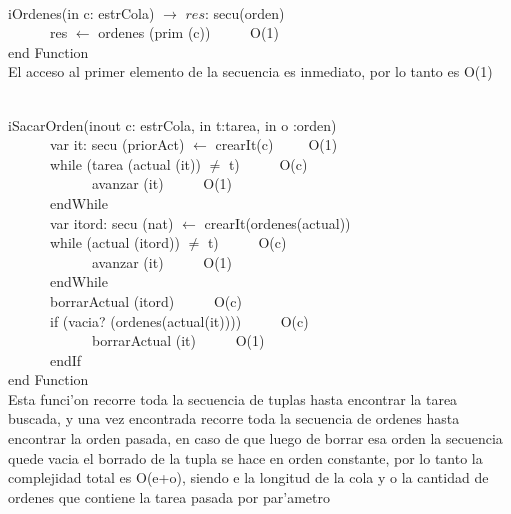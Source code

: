 \documentclass[a4paper,10pt]{article}
\begin{document}
\begin{algoritmo}
\caption{}\\
  iOrdenes(in c: estrCola) $\rightarrow$ $res$: secu(orden) \\
	\indent \ \ \ \ \ \  res $\gets$ ordenes (prim (c))  \ \ \ \ \ O(1)\\
    end Function \\
   
   El acceso al primer elemento de la secuencia es inmediato, por lo tanto es O(1)
\end{algoritmo}

\begin{algoritmo}
\caption{}\\
  iSacarOrden(inout c: estrCola, in t:tarea, in o :orden)\\
	\indent \ \ \ \ \ \ var it: secu (priorAct) $\gets$ crearIt(c)\ \ \ \ \ O(1)\\
	\indent \ \ \ \ \ \ while (tarea (actual (it)) $\neq$ t) \ \ \ \ \ O(c)\\
	\indent \ \ \ \ \ \ \ \ \ \ \ \  avanzar (it) \ \ \ \ \ O(1)\\
	\indent \ \ \ \ \ \ endWhile \ \ \ \ \ \\
	\indent \ \ \ \ \ \ var itord: secu (nat) $\gets$ crearIt(ordenes(actual)) \ \ \ \ \ \\
	\indent \ \ \ \ \ \ while (actual (itord)) $\neq$ t) \ \ \ \ \ O(c)\\
	\indent \ \ \ \ \ \ \ \ \ \ \ \  avanzar (it) \ \ \ \ \ O(1)\\
	\indent \ \ \ \ \ \ endWhile \ \ \ \ \ \\
	\indent \ \ \ \ \ \ borrarActual (itord) \ \ \ \ \ O(c)\\
	\indent \ \ \ \ \ \ if (vacia? (ordenes(actual(it)))) \ \ \ \ \ O(c)\\
	\indent \ \ \ \ \ \ \ \ \ \ \ \  borrarActual (it) \ \ \ \ \ O(1)\\
	\indent \ \ \ \ \ \ endIf \ \ \ \ \ \\
   end Function \\
   
   Esta funci'on recorre toda la secuencia de tuplas hasta encontrar la tarea buscada, y una vez encontrada recorre toda la secuencia de ordenes hasta encontrar la orden pasada, en caso de que luego de borrar esa orden la secuencia quede vacia el borrado de la tupla se hace en orden constante, por lo tanto la complejidad total es O(e+o), siendo e la longitud de la cola y o la cantidad de ordenes que contiene la tarea pasada por par'ametro
\end{algoritmo}
\end{document}
